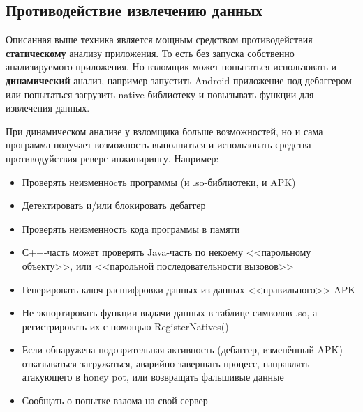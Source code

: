 \documentclass[10pt, a5paper]{article}
\begin{document}
\subsection*{Противодействие извлечению данных}

Описанная выше техника является мощным средством противодействия \textbf{статическому} анализу приложения.  То есть без запуска собственно анализируемого приложения.  Но взломщик может попытаться использовать и \textbf{динамический} анализ, например запустить Android-приложение под дебаггером или попытаться загрузить native-библиотеку и повызывать функции для извлечения данных.

При динамическом анализе у взломщика больше возможностей, но и сама программа получает возможность выполняться и использовать средства противодуйствия реверс-инжинирингу. Например:

\begin{itemize}
  \item Проверять неизменноcть программы (и .so-библиотеки, и APK)
  \item Детектировать и/или блокировать дебаггер
  \item Проверять неизменность кода программы в памяти
  \item С++-часть может проверять Java-часть по некоему <<парольному объекту>>, или <<парольной последовательности вызовов>>
  \item Генерировать ключ расшифровки данных из данных <<правильного>> APK
  \item Не экпортировать функции выдачи данных в таблице символов .so, а регистрировать их с помощью RegisterNatives()
  \item Если обнаружена подозрительная активность (дебаггер, изменённый APK)~--- отказываться загружаться, аварийно завершать
  процесс, направлять атакующего в honey pot, или возвращать фальшивые данные
  \item Сообщать о попытке взлома на свой сервер
\end{itemize}
\end{document}
